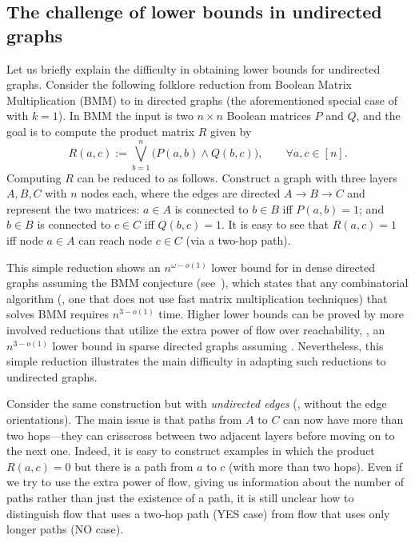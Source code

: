 \subsection{The challenge of lower bounds in undirected graphs}
Let us briefly explain the difficulty in obtaining lower bounds for undirected graphs.
Consider the following folklore reduction from Boolean Matrix Multiplication (BMM) to \APR in directed graphs
(the aforementioned special case of \APMF with $k=1$).
In BMM the input is two $n\times n$ Boolean matrices $P$ and $Q$,
and the goal is to compute the product matrix $R$ given by
%
\[
  R(a,c) := \bigvee_{b=1}^n \big( P(a,b) \wedge Q(b,c) \big),
  \qquad
  \forall a,c \in [n].
\]
Computing $R$ can be reduced to \APR as follows.
Construct a graph with three layers $A,B,C$ with $n$ nodes each,
where the edges are directed $A \to B \to C$ and represent the two matrices:
$a \in A$ is connected to $b \in B$ iff $P(a,b) =1$;
and $b \in B$ is connected to $c \in C$ iff $Q(b,c)=1$.
It is easy to see that $R(a,c)=1$ iff node $a \in A$ can reach node $c \in C$ (via a two-hop path).

This simple reduction shows an $n^{\omega-o(1)}$ lower bound for \APR
in dense directed graphs assuming the BMM conjecture (see~\cite{AW14}), which states that any combinatorial algorithm (\ie, one that does not use fast matrix multiplication techniques) that solves BMM requires $n^{3-o(1)}$ time.
Higher lower bounds can be proved by more involved reductions
that utilize the extra power of flow over reachability,
\eg, an $n^{3-o(1)}$ lower bound in sparse directed graphs assuming \SETH \cite{KT18}.
Nevertheless, this simple reduction illustrates the main difficulty
in adapting such reductions to undirected graphs.

Consider the same construction but with \emph{undirected edges}
(\ie, without the edge orientations).
The main issue is that paths from $A$ to $C$ can now have more than two hops---they can crisscross between two adjacent layers before moving on to the next one.
Indeed, it is easy to construct examples in which the product $R(a,c)=0$ but there is a path from $a$ to $c$ (with more than two hops).
Even if we try to use the extra power of flow, giving us information about the number of paths rather than just the existence of a path, it is still unclear how to distinguish flow that uses a two-hop path (YES case) from flow that uses only longer paths (NO case).


